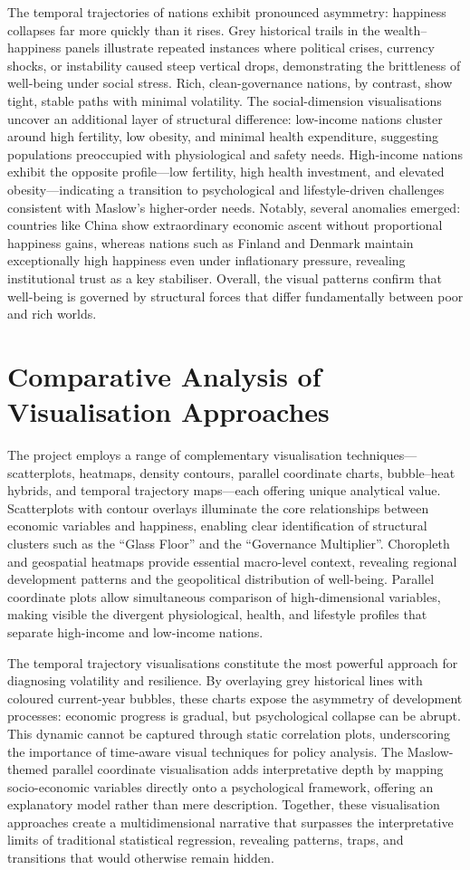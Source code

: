 \documentclass[conference]{IEEEtran}
\begin{document}
The temporal trajectories of nations exhibit pronounced asymmetry: happiness collapses far more quickly than it rises. Grey historical trails in the wealth–happiness panels illustrate repeated instances where political crises, currency shocks, or instability caused steep vertical drops, demonstrating the brittleness of well-being under social stress. Rich, clean-governance nations, by contrast, show tight, stable paths with minimal volatility. The social-dimension visualisations uncover an additional layer of structural difference: low-income nations cluster around high fertility, low obesity, and minimal health expenditure, suggesting populations preoccupied with physiological and safety needs. High-income nations exhibit the opposite profile—low fertility, high health investment, and elevated obesity—indicating a transition to psychological and lifestyle-driven challenges consistent with Maslow’s higher-order needs. Notably, several anomalies emerged: countries like China show extraordinary economic ascent without proportional happiness gains, whereas nations such as Finland and Denmark maintain exceptionally high happiness even under inflationary pressure, revealing institutional trust as a key stabiliser. Overall, the visual patterns confirm that well-being is governed by structural forces that differ fundamentally between poor and rich worlds.
\section{Comparative Analysis of Visualisation Approaches}
\noindent
The project employs a range of complementary visualisation techniques—scatterplots, heatmaps, density contours, parallel coordinate charts, bubble–heat hybrids, and temporal trajectory maps—each offering unique analytical value. Scatterplots with contour overlays illuminate the core relationships between economic variables and happiness, enabling clear identification of structural clusters such as the “Glass Floor” and the “Governance Multiplier”. Choropleth and geospatial heatmaps provide essential macro-level context, revealing regional development patterns and the geopolitical distribution of well-being. Parallel coordinate plots allow simultaneous comparison of high-dimensional variables, making visible the divergent physiological, health, and lifestyle profiles that separate high-income and low-income nations.

The temporal trajectory visualisations constitute the most powerful approach for diagnosing volatility and resilience. By overlaying grey historical lines with coloured current-year bubbles, these charts expose the asymmetry of development processes: economic progress is gradual, but psychological collapse can be abrupt. This dynamic cannot be captured through static correlation plots, underscoring the importance of time-aware visual techniques for policy analysis. The Maslow-themed parallel coordinate visualisation adds interpretative depth by mapping socio-economic variables directly onto a psychological framework, offering an explanatory model rather than mere description. Together, these visualisation approaches create a multidimensional narrative that surpasses the interpretative limits of traditional statistical regression, revealing patterns, traps, and transitions that would otherwise remain hidden.
\end{document}
